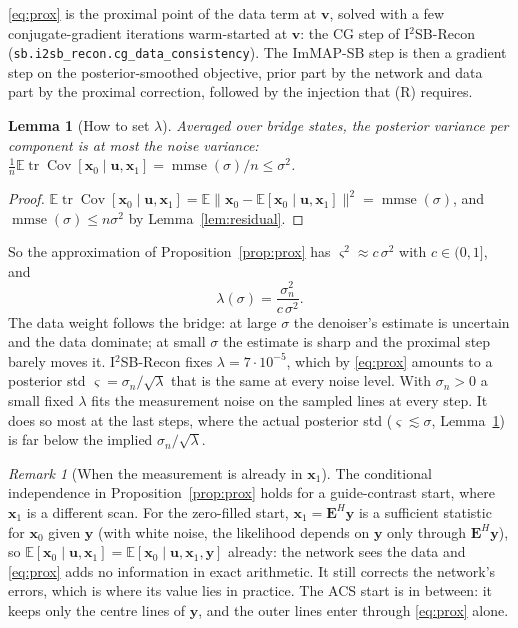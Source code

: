 \documentclass[11pt]{article}
\newtheorem{lemma}[proposition]{Lemma}
\theoremstyle{definition}
\theoremstyle{remark}
\newtheorem{remark}{Remark}
\newcommand{\x}{\bm{x}}
\newcommand{\y}{\bm{y}}
\newcommand{\uu}{\bm{u}}
\newcommand{\vv}{\bm{v}}
\newcommand{\E}{\mathbb{E}}
\newcommand{\Op}{\bm{E}}
\newcommand{\Cov}{\operatorname{Cov}}
\newcommand{\mmse}{\operatorname{mmse}}
\newcommand{\code}[1]{\texttt{#1}}
\begin{document}
\eqref{eq:prox} is the proximal point of the data term at $\vv$, solved with a few
conjugate-gradient iterations warm-started at $\vv$: the CG step of
I$^2$SB-Recon~\cite{wang2024} (\code{sb.i2sb\_recon.cg\_data\_consistency}). The ImMAP-SB step
is then a gradient step on the posterior-smoothed objective, prior part by the network and
data part by the proximal correction, followed by the injection that (R) requires.

\begin{lemma}[How to set $\lambda$]\label{lem:lambda}
Averaged over bridge states, the posterior variance per component is at most the noise
variance: $\tfrac1n\E\operatorname{tr}\Cov[\x_0\mid\uu,\x_1] = \mmse(\sigma)/n\le\sigma^2$.
\end{lemma}
\begin{proof}
$\E\operatorname{tr}\Cov[\x_0\mid\uu,\x_1] = \E\|\x_0 - \E[\x_0\mid\uu,\x_1]\|^2 =
\mmse(\sigma)$, and $\mmse(\sigma)\le n\sigma^2$ by Lemma~\ref{lem:residual}.
\end{proof}

So the approximation of Proposition~\ref{prop:prox} has $\varsigma^2\approx c\,\sigma^2$ with
$c\in(0,1]$, and
\begin{equation}
  \lambda(\sigma) = \frac{\sigma_n^2}{c\,\sigma^2}.
  \label{eq:lambda}
\end{equation}
The data weight follows the bridge: at large $\sigma$ the denoiser's estimate is uncertain and
the data dominate; at small $\sigma$ the estimate is sharp and the proximal step barely moves
it. I$^2$SB-Recon fixes $\lambda = 7\cdot10^{-5}$, which by \eqref{eq:prox} amounts to a
posterior std $\varsigma = \sigma_n/\sqrt\lambda$ that is the same at every noise level. With
$\sigma_n>0$ a small fixed $\lambda$ fits the measurement noise on the sampled lines at every
step. It does so most at the last steps, where the actual posterior std
($\varsigma\lesssim\sigma$, Lemma~\ref{lem:lambda}) is far below the implied
$\sigma_n/\sqrt\lambda$.

\begin{remark}[When the measurement is already in $\x_1$]
The conditional independence in Proposition~\ref{prop:prox} holds for a guide-contrast start,
where $\x_1$ is a different scan. For the zero-filled start, $\x_1 = \Op^H\y$ is a sufficient
statistic for $\x_0$ given $\y$ (with white noise, the likelihood depends on $\y$ only through
$\Op^H\y$), so $\E[\x_0\mid\uu,\x_1] = \E[\x_0\mid\uu,\x_1,\y]$ already: the network sees the
data and \eqref{eq:prox} adds no information in exact arithmetic. It still corrects the
network's errors, which is where its value lies in practice. The ACS start is in between: it
keeps only the centre lines of $\y$, and the outer lines enter through \eqref{eq:prox} alone.
\end{remark}
\end{document}
